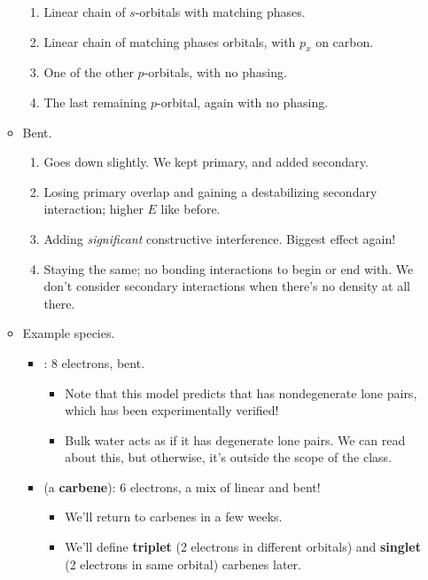 \documentclass[../notes.tex]{subfiles}
\begin{document}
\begin{itemize}
\begin{itemize}
        \begin{enumerate}[label={\textbf{\Alph*}.}]
            \item Linear chain of $s$-orbitals with matching phases.
            \item Linear chain of matching phases orbitals, with $p_x$ on carbon.
            \item One of the other $p$-orbitals, with no phasing.
            \item The last remaining $p$-orbital, again with no phasing.
        \end{enumerate}
        \item Bent.
        \begin{enumerate}[label={\textbf{\Alph*}.}]
            \item Goes down slightly. We kept primary, and added secondary.
            \item Losing primary overlap and gaining a destabilizing secondary interaction; higher $E$ like before.
            \item Adding \emph{significant} constructive interference. Biggest effect again!
            \item Staying the same; no bonding interactions to begin or end with. We don't consider secondary interactions when there's no density at all there.
        \end{enumerate}
        \item Example species.
        \begin{itemize}
            \item {}: 8 electrons, bent.
            \begin{itemize}
                \item Note that this model predicts that  has nondegenerate lone pairs, which has been experimentally verified!
                \item Bulk water acts as if it has degenerate lone pairs. We can read \textcite{bib:Anslyn} about this, but otherwise, it's outside the scope of the class.
            \end{itemize}
            \pagebreak
            \item {} (a \textbf{carbene}): 6 electrons, a mix of linear and bent!
            \begin{itemize}
                \item We'll return to carbenes in a few weeks.
                \item We'll define \textbf{triplet} (2 electrons in different orbitals) and \textbf{singlet} (2 electrons in same orbital) carbenes later.

\end{itemize}
\end{itemize}
\end{itemize}
\end{itemize}
\end{document}
